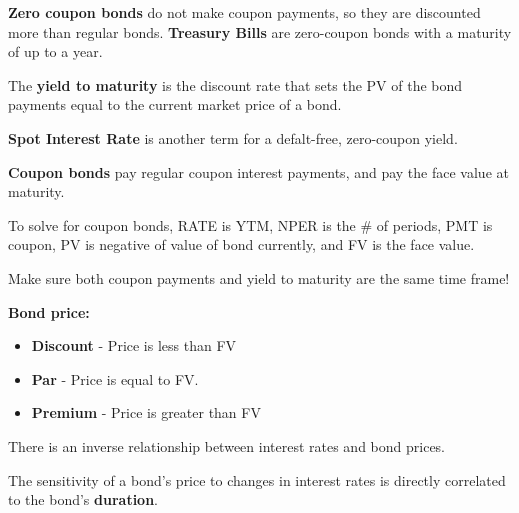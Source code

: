 \documentclass[english, 12pt]{article}
\begin{document}
\begin{defn}
\textbf{Zero coupon bonds} do not make coupon payments, so they are discounted more than regular bonds. \textbf{Treasury Bills} are zero-coupon bonds with a maturity of up to a year.
\end{defn}

\begin{defn}
The \textbf{yield to maturity} is the discount rate that sets the PV of the bond payments equal to the current market price of a bond.
\end{defn}

\begin{defn}
\textbf{Spot Interest Rate} is another term for a defalt-free, zero-coupon yield.
\end{defn}

\begin{defn}
\textbf{Coupon bonds} pay regular coupon interest payments, and pay the face value at maturity. 
\end{defn}

\begin{note}
To solve for coupon bonds, RATE is YTM, NPER is the \# of periods, PMT is coupon, PV is negative of value of bond currently, and FV is the face value.
\end{note}

\begin{qte}
Make sure both coupon payments and yield to maturity are the same time frame!
\end{qte}

\begin{defn}
\textbf{Bond price:}
\begin{itemize}
\item \textbf{Discount} - Price is less than FV
\item \textbf{Par} - Price is equal to FV.
\item \textbf{Premium} - Price is greater than FV
\end{itemize}
\end{defn}

\begin{note}
There is an inverse relationship between interest rates and bond prices.
\end{note}

\begin{qte}
The sensitivity of a bond's price to changes in interest rates is directly correlated to the bond's \textbf{duration}. 
\end{qte}
\end{document}
